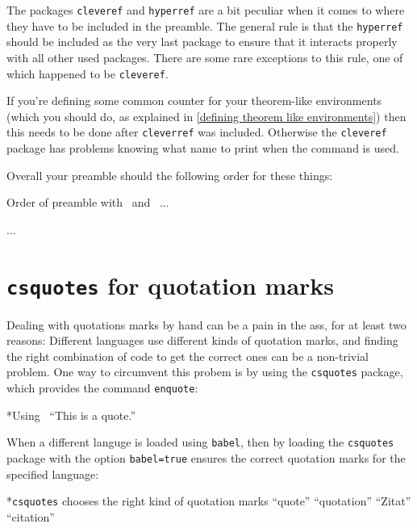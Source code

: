 The packages \texttt{cleveref} and \texttt{hyperref} are a bit peculiar when it comes to where they have to be included in the preamble.
The general rule is that the \texttt{hyperref} should be included as the very last package to ensure that it interacts properly with all other used packages.
There are some rare exceptions to this rule, one of which happened to be \texttt{cleveref}.

If you’re defining some common counter for your theorem-like environments (which you should do, as explained in \cref{defining theorem like environments}) then this needs to be done after \texttt{cleverref} was included.
Otherwise the \texttt{cleveref} package has problems knowing what name to print when the command  is used.

Overall your preamble should the following order for these things:
\begin{showcode}{Order of preamble with~ and~}
...
\usepackage{amsthm}
...

\usepackage{hyperref}
\usepackage{cleveref}

\newtheorem{theorem}[everything]{Theorem}
\end{showcode}





\section{\texttt{csquotes} for quotation marks}

Dealing with quotations marks by hand can be a pain in the ass, for at least two reasons:
Different languages use different kinds of quotation marks, and finding the right combination of  code to get the correct ones can be a non-trivial problem.
One way to circumvent this probem is by using the \texttt{csquotes} package, which provides the command \texttt{enquote}:
\begin{showlatex}*{Using~}
\enquote{This is a quote.}
\end{showlatex}
When a different languge is loaded using \texttt{babel}, then by loading the \texttt{csquotes} package with the option \texttt{babel=true} ensures the correct quotation marks for the specified language:
\begin{showlatex}*{\texttt{csquotes} chooses the right kind of quotation marks}
\enquote{quote}
\enquote{quotation}
\enquote{Zitat}
\enquote{citation}
\end{showlatex}

